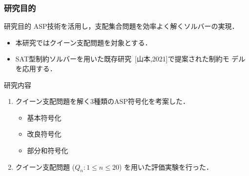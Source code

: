 \documentclass[dvipdfmx,10pt]{beamer}
\begin{document}
\begin{frame}\frametitle{研究目的}
 \begin{alertblock}{研究目的}
  ASP技術を活用し，支配集合問題を効率よく解くソルバーの実現．
 \end{alertblock}

 \begin{itemize}
 \item 本研究ではクイーン支配問題を対象とする．
 \item SAT型制約ソルバーを用いた既存研究~[山本,2021]で提案された制約モ
   デルを応用する．
 \end{itemize}

 \begin{block}{研究内容}
  \begin{enumerate}
   \item クイーン支配問題を解く3種類のASP符号化を考案した．
     \begin{itemize}
     \item 基本符号化
     \item 改良符号化
     \item 部分和符号化
     \end{itemize}
   \item クイーン支配問題 ($Q_{n}: 1\leq n\leq 20$) を用いた評価実験を行った．
  \end{enumerate}
 \end{block}
\end{frame}

%
%
\end{document}
